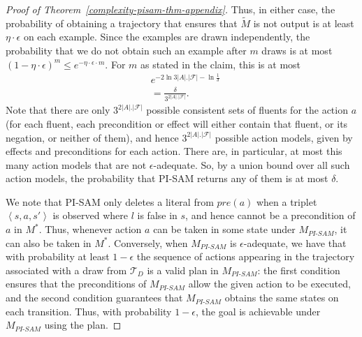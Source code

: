 \documentclass[letterpaper]{article} %
\newcommand{\tuple}[1]{\ensuremath{\left \langle #1 \right \rangle }}
\newcommand{\pre}{\textit{pre}}
\newcommand{\eff}{\textit{eff}}
\newcommand{\pisam}{\textit{PI-SAM}\xspace}
\newcommand{\iseff}{\textit{IsEff}}
\begin{document}
\begin{proof}[Proof of Theorem~\ref{complexity-pisam-thm-appendix}]
Thus, in either case, the probability of obtaining a trajectory that ensures that $\tilde{M}$ is not output is at least $\eta\cdot\epsilon$ on each example. Since the examples are drawn independently, the probability that we do not obtain such an example after $m$ draws is at most $(1-\eta\cdot\epsilon)^m\leq e^{-\eta\cdot\epsilon\cdot m}$. For $m$ as stated in the claim, this is at most
\begin{align*}
&e^{-2\ln 3 |A|.{|\mathcal{F}|} - \ln \frac{1}{\delta}}\\
&= \frac{\delta}{3^{2|A|.{|\mathcal{F}|}}}.
\end{align*}
Note that there are only $3^{2 |A|.{|\mathcal{F}|}}$ possible consistent sets of fluents for the action $a$ (for each fluent, each precondition or effect will either contain that fluent, or its negation, or neither of them), and hence $3^{2|A|.{|\mathcal{F}|}}$ possible action models, given by effects and preconditions for each action. There are, in particular, at most this many action models that are not $\epsilon$-adequate. So, by a union bound over all such action models, the probability that PI-SAM returns any of them is at most $\delta$.

We note that PI-SAM only deletes a literal from $\pre(a)$ when a triplet $\tuple{s,a,s'}$ is observed where $l$ is false in $s$, and hence cannot be a precondition of $a$ in $M^*$. Thus, whenever action $a$ can be taken in some state under $M_\pisam$, it can also be taken in $M^*$. Conversely, when $M_\pisam$ is $\epsilon$-adequate, we have that with probability at least $1-\epsilon$ the sequence of actions appearing in the trajectory associated with a draw from $\mathcal{T}_D$ is a valid plan in $M_\pisam$: the first condition ensures that the preconditions of $M_\pisam$ allow the given action to be executed, and the second condition guarantees that $M_\pisam$ obtains the same states on each transition. Thus, with probability $1-\epsilon$, the goal is achievable under $M_\pisam$ using the plan.
\end{proof}

        
\end{document}
